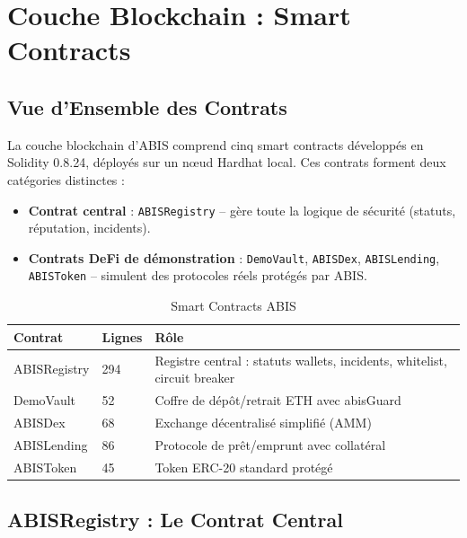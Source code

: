 \documentclass[12pt,a4paper]{report}
\newcommand{\code}[1]{\texttt{#1}}
\begin{document}
\chapter{Couche Blockchain : Smart Contracts}
\vspace{0pt}
\vspace{1cm}

\section{Vue d'Ensemble des Contrats}

La couche blockchain d'ABIS comprend cinq smart contracts développés en Solidity 0.8.24, déployés sur un nœud Hardhat local. Ces contrats forment deux catégories distinctes :

\begin{itemize}
  \item \textbf{Contrat central} : \code{ABISRegistry} -- gère toute la logique de sécurité (statuts, réputation, incidents).
  \item \textbf{Contrats DeFi de démonstration} : \code{DemoVault}, \code{ABISDex}, \code{ABISLending}, \code{ABISToken} -- simulent des protocoles réels protégés par ABIS.
\end{itemize}

\begin{table}[H]
\centering
\caption{Smart Contracts ABIS}
\label{tab:contracts}
\begin{tabularx}{\linewidth}{L{3.5cm} C{1.5cm} L{7.5cm}}
\toprule
\textbf{Contrat} & \textbf{Lignes} & \textbf{Rôle} \\
\midrule
ABISRegistry & 294 & Registre central : statuts wallets, incidents, whitelist, circuit breaker \\
DemoVault & 52 & Coffre de dépôt/retrait ETH avec abisGuard \\
ABISDex & 68 & Exchange décentralisé simplifié (AMM) \\
ABISLending & 86 & Protocole de prêt/emprunt avec collatéral \\
ABISToken & 45 & Token ERC-20 standard protégé \\
\bottomrule
\end{tabularx}
\end{table}

\section{ABISRegistry : Le Contrat Central}
\end{document}
